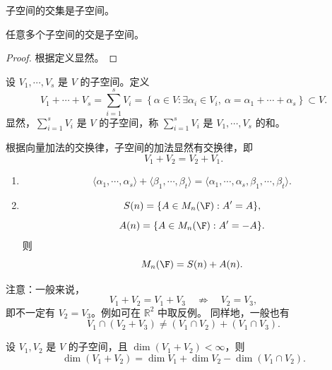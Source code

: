 子空间的交集是子空间。

\begin{proposition}
	任意多个子空间的交是子空间。
\end{proposition}

\begin{proof}
	根据定义显然。
\end{proof}

\begin{definition}
	设 $V_1,\cdots,V_s$ 是 $V$ 的子空间。定义
	\[
	V_1+\cdots+V_s
	=\sum_{i=1}^{s}V_i
	=\left\{\alpha\in V:\exists \alpha_i\in V_i,\
	\alpha=\alpha_1+\cdots+\alpha_s\right\}\subset V.
	\]
	显然，$\sum\limits_{i=1}^{s}V_i$ 是 $V$ 的子空间，称 $\sum\limits_{i=1}^{s}V_i$ 是 $V_1,\cdots,V_s$ 的和。
\end{definition}

根据向量加法的交换律，子空间的加法显然有交换律，即
\[
V_1+V_2=V_2+V_1.
\]

\begin{example}
	\begin{enumerate}
		\item
		\[
		\langle \alpha_1,\cdots,\alpha_s\rangle
		+
		\langle \beta_1,\cdots,\beta_t\rangle
		=
		\langle \alpha_1,\cdots,\alpha_s,\beta_1,\cdots,\beta_t\rangle.
		\]
		
		\item 
		\[
		S(n)=\{A\in M_n(\F):A'=A\},
		\]
		\[
		A(n)=\{A\in M_n(\F):A'=-A\}.
		\]
		则
		\[
		M_n(\F)=S(n)+A(n).
		\]
	\end{enumerate}
\end{example}

注意：一般来说，
\[
V_1+V_2=V_1+V_3
\quad\not\Rightarrow\quad
V_2=V_3,
\]
即不一定有 $V_2=V_3$。例如可在 $\mathbb{R}^2$ 中取反例。
同样地，一般也有
\begin{equation}
V_1\cap (V_2+V_3)
\neq
(V_1\cap V_2)+(V_1\cap V_3).
\tag{$*$}
\end{equation}
\begin{proposition}
	设 $V_1,V_2$ 是 $V$ 的子空间，且 $\dim(V_1+V_2)<\infty$，则
	\[
	\dim(V_1+V_2)
	=
	\dim V_1+\dim V_2-\dim(V_1\cap V_2).
	\]
\end{proposition}

